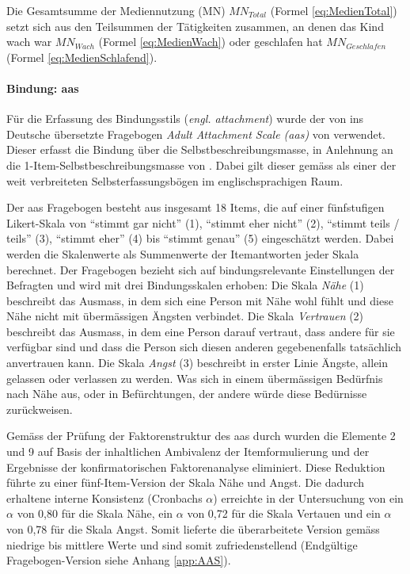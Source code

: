 Die Gesamtsumme der Mediennutzung (MN) $MN_{Total}$ (Formel \ref{eq:MedienTotal}) setzt sich aus den Teilsummen der Tätigkeiten zusammen, an denen das Kind wach war $MN_{Wach}$ (Formel \ref{eq:MedienWach}) oder geschlafen hat $MN_{Geschlafen}$ (Formel \ref{eq:MedienSchlafend}).


\paragraph{Bindung: \acrfull{aas}}\label{sec:AAS}
Für die Erfassung des Bindungsstils (\textit{engl. attachment}) wurde der von  ins Deutsche übersetzte Fragebogen \textit{Adult Attachment Scale (\acrshort{aas})} von  verwendet. Dieser erfasst die Bindung über die Selbstbeschreibungsmasse, in Anlehnung an die 1-Item-Selbst\-beschreibungs\-masse von . Dabei gilt dieser gemäss  als einer der weit verbreiteten Selbst\-er\-fassungs\-bögen im englisch\-sprachigen Raum.

Der \acrshort{aas} Fragebogen besteht aus insgesamt 18 Items, die auf einer fünfstufigen Likert-Skala von \enquote{stimmt gar nicht} (1), \enquote{stimmt eher nicht} (2), \enquote{stimmt teils / teils} (3), \enquote{stimmt eher} (4) bis \enquote{stimmt genau} (5) eingeschätzt werden. Dabei werden die Skalenwerte als Summenwerte der Itemantworten jeder Skala berechnet. Der Fragebogen bezieht sich auf bindungsrelevante Einstellungen der Befragten und wird mit drei Bindungsskalen erhoben: Die Skala \textit{Nähe} (1) beschreibt das Ausmass, in dem sich eine Person mit Nähe wohl fühlt und diese Nähe nicht mit übermässigen Ängsten verbindet. Die Skala \textit{Vertrauen} (2) beschreibt das Ausmass, in dem eine Person darauf vertraut, dass andere für sie verfügbar sind und dass die Person sich diesen anderen gegebenenfalls tatsächlich anvertrauen kann. Die Skala \textit{Angst} (3) beschreibt in erster Linie Ängste, allein gelassen oder verlassen zu werden. Was sich in einem übermässigen Bedürfnis nach Nähe aus, oder in Befürchtungen, der andere würde diese Bedürnisse zurückweisen. 

Gemäss der Prüfung der Faktorenstruktur des \acrshort{aas} durch  wurden die Elemente 2 und 9 auf Basis der inhaltlichen Ambivalenz der Itemformulierung und der Ergebnisse der konfirmatorischen Faktorenanalyse eliminiert. Diese Reduktion führte zu einer fünf-Item-Version der Skala Nähe und Angst. Die dadurch erhaltene interne Konsistenz (Cronbachs $\alpha$) erreichte in der Untersuchung von  ein $\alpha$ von 0,80 für die Skala Nähe, ein $\alpha$ von 0,72 für die Skala Vertauen und ein $\alpha$ von 0,78 für die Skala Angst. Somit lieferte die überarbeitete Version gemäss  niedrige bis mittlere Werte und sind somit zufriedenstellend (Endgültige Fragebogen-Version siehe Anhang \ref{app:AAS}).

